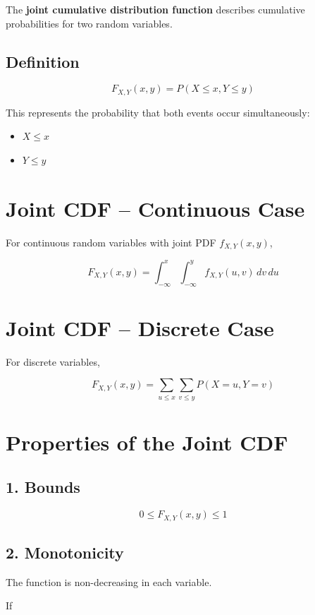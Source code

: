 \documentclass[12pt]{article}
\begin{document}
The \textbf{joint cumulative distribution function} describes cumulative probabilities for two random variables.

\subsection*{Definition}

\[
F_{X,Y}(x,y) = P(X \le x, Y \le y)
\]

This represents the probability that both events occur simultaneously:

\begin{itemize}
\item $X \le x$
\item $Y \le y$
\end{itemize}

\section{Joint CDF -- Continuous Case}

For continuous random variables with joint PDF $f_{X,Y}(x,y)$,

\[
F_{X,Y}(x,y)
=
\int_{-\infty}^{x}
\int_{-\infty}^{y}
f_{X,Y}(u,v)\,dv\,du
\]

\section{Joint CDF -- Discrete Case}

For discrete variables,

\[
F_{X,Y}(x,y)
=
\sum_{u \le x} \sum_{v \le y}
P(X=u, Y=v)
\]

\section{Properties of the Joint CDF}

\subsection*{1. Bounds}

\[
0 \le F_{X,Y}(x,y) \le 1
\]

\subsection*{2. Monotonicity}

The function is non-decreasing in each variable.

If
\end{document}
